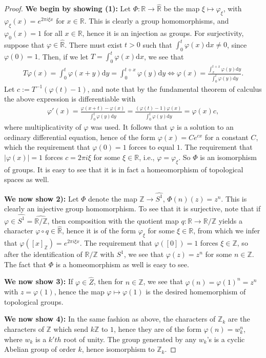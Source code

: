 \documentclass[10pt,twoside,openany,final]{memoir}
\theoremstyle{definition}
\theoremstyle{Break}
\newcommand{\R}{\mathbb{R}}
\newcommand{\Z}{\mathbb{Z}}
\renewcommand{\d}{\mathrm{d}}
\begin{document}
\begin{proof}
	\textbf{We begin by showing (1):} Let $\Phi \colon \R \to \widehat{\R}$ be the map $\xi \mapsto \varphi_\xi$, with $\varphi_\xi(x)=e^{2 \pi i \xi x}$ for $ x \in \R$. This is clearly a group homomorphisms, and $\varphi_0(x)=1$ for all $x \in \R$, hence it is an injection as groups. For surjectivity, suppose that $\varphi \in \widehat{\R}$. There must exist $t>0$ such that $\int_0^t \varphi(x)\d x \neq 0$, since $\varphi(0)=1$. Then, if we let $T=\int_0^t \varphi(x) \d x$, we see that
\begin{align*}
	T\varphi(x) = \int_0^t \varphi(x+y) \d y = \int_0^{t+x}\varphi(y) \d y \iff \varphi(x) = \frac{\int_x^{t+x}\varphi(y) \d y}{\int_0^t \varphi(y) \d y}.
\end{align*}
Let $c:=T^{-1}(\varphi(t)-1)$, and note that by the fundamental theorem of calculus the above expression is differentiable with
\begin{align*}
	\varphi'(x)=\frac{\varphi(x+t)-\varphi(x)}{\int_0^t \varphi(y) \d y}= \frac{(\varphi(t)-1)\varphi(x)}{\int_0^t \varphi(y) \d y}= \varphi(x) c,
\end{align*}
where multiplicativity of $\varphi$ was used. It follows that $\varphi$ is a solution to an ordinary differential equation, hence of the form $\varphi(x)=Ce^{cx}$ for a constant $C$, which the requirement that $\varphi(0)=1$ forces to equal $1$. The requirement that $|\varphi(x)|=1$ forces $c=2 \pi i \xi$ for some $\xi \in \R$, i.e., $\varphi=\varphi_\xi$. So $\Phi$ is an isomorphism of groups. It is easy to see that it is in fact a homeomorphism of topological spaces as well.

\textbf{We now show 2):} Let $\Phi$ denote the map $\Z \to \widehat{S^1}$, $\Phi(n)(z)=z^n$. This is clearly an injective group homomorphism. To see that it is surjective, note that if $\varphi \in \widehat{S^1}=\widehat{\R/\Z}$, then composition with the quotient map $q \colon \R \to \R/\Z$ yields a character $\varphi \circ q \in \widehat{\R}$, hence it is of the form $\varphi_\xi$ for some $\xi \in \R$, from which we infer that $\varphi([x]_\Z)=e^{2 \pi i \xi x}$. The requirement that $\varphi([0])=1$ forces $\xi \in \Z$, so after the identification of $\R/\Z$ with $S^1$, we see that $\varphi(z)=z^n$ for some $n \in \Z$. The fact that $\Phi$ is a homeomorphism as well is easy to see.

\textbf{We now show 3):} If $\varphi \in \widehat{Z}$, then for $n \in \Z$, we see that $\varphi(n)=\varphi(1)^n=z^n$ with $z = \varphi(1)$, hence the map $\varphi \mapsto \varphi(1)$ is the desired homemorphism of topological groups.

\textbf{We now show 4):} In the same fashion as above, the characters of $\Z_k$ are the characters of $\Z$ which send $k\Z$ to $1$, hence they are of the form $\varphi(n)=w_k^n$, where $w_k$ is a $k'th$ root of unity. The group generated by any $w_k$'s is a cyclic Abelian group of order $k$, hence isomorphism to $\Z_k$.
\end{proof}
\end{document}
